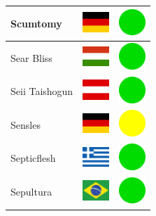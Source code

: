 \documentclass[12pt, a4paper, twoside]{report}
\begin{document}
\begin{center}
\begin{longtable}{|p{5cm}|p{2cm}|p{2cm}|}
 Scumtomy                                                   & \includegraphics[width=1cm]{../img/flags/de} &   \includegraphics[width=1cm]{../likes/y} \\ \hline
 Sear Bliss                                                 & \includegraphics[width=1cm]{../img/flags/hu} &   \includegraphics[width=1cm]{../likes/y} \\ \hline
 Seii Taishogun                                             & \includegraphics[width=1cm]{../img/flags/at} &   \includegraphics[width=1cm]{../likes/y} \\ \hline
 Sensles                                                    & \includegraphics[width=1cm]{../img/flags/de} &   \includegraphics[width=1cm]{../likes/m} \\ \hline
 Septicflesh                                                & \includegraphics[width=1cm]{../img/flags/gr} &   \includegraphics[width=1cm]{../likes/y} \\ \hline
 Sepultura                                                  & \includegraphics[width=1cm]{../img/flags/br} &   \includegraphics[width=1cm]{../likes/y} \\ \hline

\end{longtable}
\end{center}
\end{document}
